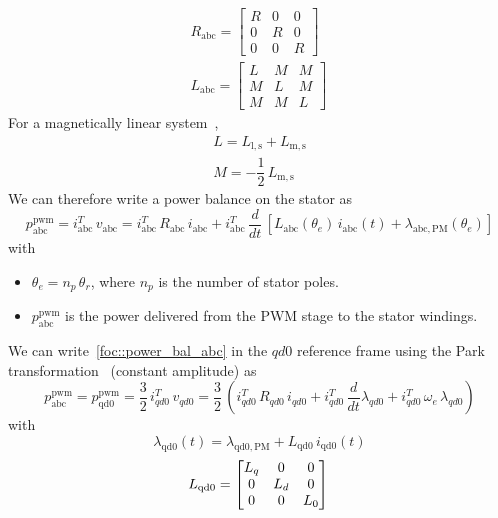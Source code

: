 \documentclass[letterpaper, 10 pt, conference]{ieeeconf}  %
\begin{document}
\begin{eqnarray}
R_{\mathrm{abc}} =
\begin{bmatrix}
R & 0 & 0\\
0 & R & 0\\
0 & 0 & R
\end{bmatrix}\\
L_{\mathrm{abc}} =
\begin{bmatrix}
L & M & M\\
M & L & M\\
M & M & L
\end{bmatrix}\,
\end{eqnarray}
For a magnetically linear system~\cite{foc::krause2013analysis}, 
\begin{eqnarray}
L = L_{\mathrm{l, s}} + L_{\mathrm{m, s}}\\
M = -\dfrac{1}{2}\,L_{\mathrm{m, s}}
\end{eqnarray}
We can therefore write a power balance on the stator as
\begin{dmath}\label{foc::power_bal_abc}
p_{\mathrm{abc}}^{\mathrm{pwm}} = i_{\mathrm{abc}}^T\,v_{\mathrm{abc}} = i_{\mathrm{abc}}^T\,R_{\mathrm{abc}}\,i_{\mathrm{abc}} + i_{\mathrm{abc}}^T\,\dfrac{d}{dt}\,\left[L_{\mathrm{abc}}\left(\theta_e\right)\,i_{\mathrm{abc}}(t) + \lambda_{\mathrm{abc, PM}}\left(\theta_e\right)\right]
\end{dmath}
with 
\begin{itemize}
	\item $\theta_e = n_p\,\theta_r$, where $n_p$ is the number of stator poles.
	\item $p_{\mathrm{abc}}^{\mathrm{pwm}}$ is the power delivered from the PWM stage to the stator windings.
\end{itemize}
We can write~\eqref{foc::power_bal_abc} in the $qd0$ reference frame using the Park transformation~\cite{foc::krause2013analysis} (constant amplitude) as
\begin{dmath}\label{foc::power_bal_qd0}
	p_{\mathrm{abc}}^{\mathrm{pwm}} = p_{\mathrm{qd0}}^{\mathrm{pwm}} = \dfrac{3}{2}\,i_{qd0}^T\,v_{qd0}= \dfrac{3}{2}\,\left(i_{qd0}^T\,R_{qd0}\,i_{qd0} + i_{qd0}^T\,\dfrac{d}{dt}\lambda_{qd0} + i_{qd0}^T\,\omega_e\,\lambda_{qd0}\right)
\end{dmath}
with
\begin{equation}
\lambda_{\mathrm{qd0}}(t) = \lambda_{\mathrm{qd0, PM}} + L_{\mathrm{qd0}}\,i_{\mathrm{qd0}}(t) 
\end{equation}
\begin{equation}
L_{\mathrm{qd0}} =
\begin{bmatrix}
L_q & 0 & 0\\
0 & L_d & 0\\
0 & 0 & L_0
\end{bmatrix}\\
\end{equation}
\end{document}
